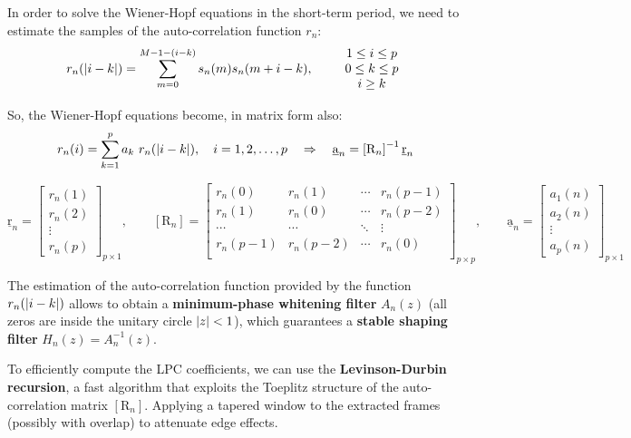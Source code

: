 In order to solve the Wiener-Hopf equations in the short-term period, we need to estimate the samples of the auto-correlation function $ r_n $:
\[ r_n(\abs{i-k}) = \sum_{m=0}^{M-1-(i-k)} s_n(m) s_n(m+i-k), \qquad
\begin{array}{c}
    1 \leq i \leq p \\
    0 \leq k \leq p \\
    i \geq k
\end{array} \]

\clearpage

So, the Wiener-Hopf equations become, in matrix form also:
\[ r_n(i) = \sum_{k=1}^p a_k \ r_n(\abs{i-k}), \quad i = 1, 2, \dots, p \quad \Rightarrow \quad \underline{\mathrm{a}}_n = \left[\mathrm{R}_n\right]^{-1} \underline{\mathrm{r}}_n \]

\[ \underline{\mathrm{r}}_n = \left[
\begin{array}{c}
    r_n(1) \\
    r_n(2) \\
    \vdots \\
    r_n(p)
\end{array} \right]_{p \times 1}, \qquad \left[\mathrm{R}_n\right] = \left[
\begin{array}{cccc}
    r_n(0) & r_n(1) & \cdots & r_n(p-1) \\
    r_n(1) & r_n(0) & \cdots & r_n(p-2) \\
    \cdots & \cdots & \ddots & \vdots \\
    r_n(p-1) & r_n(p-2) & \cdots & r_n(0) \\
\end{array} \right]_{p \times p}, \qquad \underline{\mathrm{a}}_n = \left[
\begin{array}{c}
    a_1(n) \\
    a_2(n) \\
    \vdots \\
    a_p(n)
\end{array} \right]_{p \times 1} \]

The estimation of the auto-correlation function provided by the function $r_n(\abs{i-k})$ allows to obtain a \textbf{minimum-phase whitening filter} $A_n(z)$ (all zeros are inside the unitary circle $\abs{z}<1$), which guarantees a \textbf{stable shaping filter} $H_n(z) = A_n^{-1}(z)$.

To efficiently compute the LPC coefficients, we can use the \textbf{Levinson-Durbin recursion}, a fast algorithm that exploits the Toeplitz
structure of the auto-correlation matrix $\left[\mathrm{R}_n\right]$.
Applying a tapered window to the extracted frames (possibly with overlap) to attenuate edge effects.


